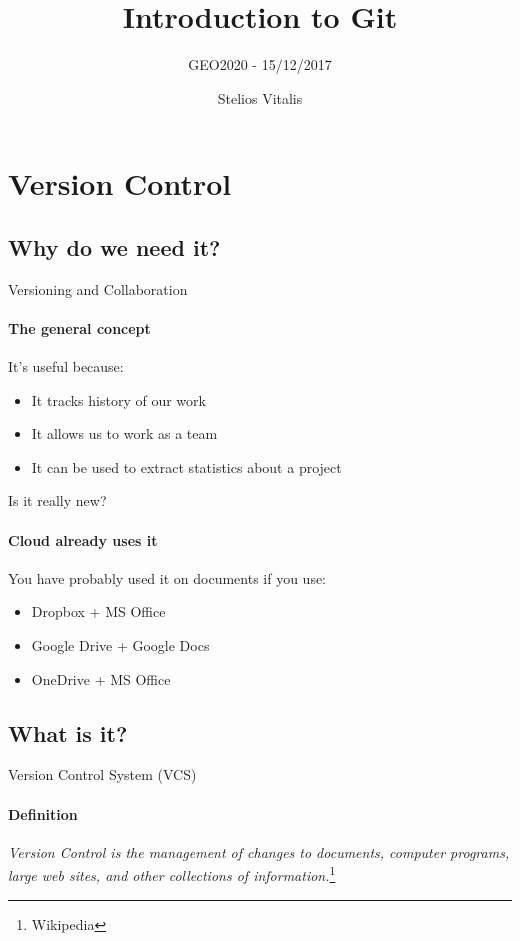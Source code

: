 \documentclass{beamer}
\title{Introduction to Git} %
\subtitle{GEO2020 - 15/12/2017} %
\author{Stelios Vitalis}
\begin{document}
  \frame{\maketitle}


	\section{Version Control}
\subsection{Why do we need it?}
\begin{frame}{Versioning and Collaboration}
\framesubtitle{The general concept}
It's useful because:
\begin{itemize}
	\item It tracks history of our work
	\item It allows us to work as a team
	\item It can be used to extract statistics about a project
\end{itemize}
\end{frame}

\begin{frame}{Is it really new?}
\framesubtitle{Cloud already uses it}
You have probably used it on documents if you use:
\begin{itemize}
\item Dropbox + MS Office
\item Google Drive + Google Docs
\item OneDrive + MS Office
\end{itemize}
\end{frame}

\subsection{What is it?}
\begin{frame}{Version Control System (VCS)}
\framesubtitle{Definition}

\begin{definition}
	\emph{Version Control is the \alert{management} of changes to documents, computer programs, large web sites, and other collections of information.}\footnote[frame]{Wikipedia}
\end{definition}
\end{frame}
\end{document}
